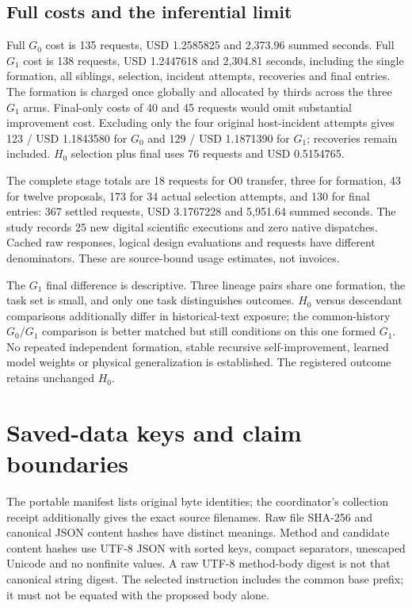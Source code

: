 \subsection{Full costs and the inferential limit}
Full $G_0$ cost is 135 requests, USD 1.2585825 and 2,373.96 summed seconds.
Full $G_1$ cost is 138 requests, USD 1.2447618 and 2,304.81 seconds, including
the single formation, all siblings, selection, incident attempts, recoveries
and final entries. The formation is charged once globally and allocated by
thirds across the three $G_1$ arms. Final-only costs of 40 and 45 requests
would omit substantial improvement cost. Excluding only the four original
host-incident attempts gives 123 / USD 1.1843580 for $G_0$ and
129 / USD 1.1871390 for $G_1$; recoveries remain included. $H_0$ selection plus
final uses 76 requests and USD 0.5154765.

The complete stage totals are 18 requests for O0 transfer, three for formation,
43 for twelve proposals, 173 for 34 actual selection attempts, and 130 for final
entries: 367 settled requests, USD 3.1767228 and 5,951.64 summed seconds.
The study records 25 new digital scientific executions and zero native
dispatches. Cached raw responses, logical design evaluations and requests have
different denominators. These are source-bound usage estimates, not invoices.

The $G_1$ final difference is descriptive. Three lineage pairs share one
formation, the task set is small, and only one task distinguishes outcomes.
$H_0$ versus descendant comparisons additionally differ in historical-text
exposure; the common-history $G_0/G_1$ comparison is better matched but still
conditions on this one formed $G_1$. No repeated independent formation, stable
recursive self-improvement, learned model weights or physical generalization
is established. The registered outcome retains unchanged $H_0$.

\FloatBarrier
\section{Saved-data keys and claim boundaries}
The portable manifest lists original byte identities; the coordinator's
collection receipt additionally gives the exact source filenames. Raw file
SHA-256 and canonical JSON content hashes have distinct meanings. Method and
candidate content hashes use UTF-8 JSON with sorted keys, compact separators,
unescaped Unicode and no nonfinite values. A raw UTF-8 method-body digest is
not that canonical string digest. The selected instruction includes the common
base prefix; it must not be equated with the proposed body alone.

